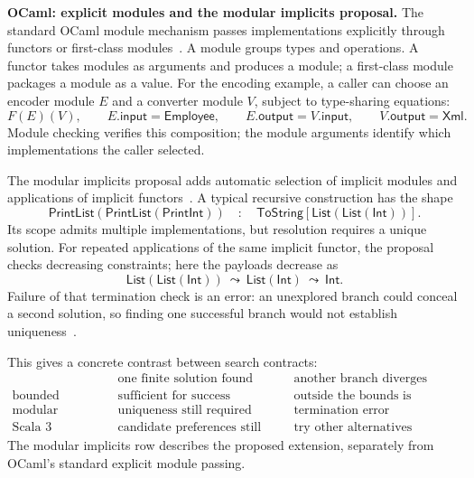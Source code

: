 \documentclass[10pt,a4paper]{article}
\newcommand{\Int}{\mathsf{Int}}
\newcommand{\TS}{\mathsf{ToString}}
\newcommand{\kw}[1]{\mathsf{#1}}
\begin{document}
\textbf{OCaml: explicit modules and the modular implicits proposal.}
The standard OCaml module mechanism passes implementations explicitly through
functors or first-class modules~\cite{ocaml-modules}.
A module groups types and operations. A functor takes modules as arguments and
produces a module; a first-class module packages a module as a value.
For the encoding example, a caller can choose an encoder module $E$ and a
converter module $V$, subject to type-sharing equations:
\[
 F(E)(V),\qquad E.\kw{input}=\kw{Employee},\qquad
 E.\kw{output}=V.\kw{input},\qquad V.\kw{output}=\kw{Xml}.
\]
Module checking verifies this composition; the module arguments identify which
implementations the caller selected.

The modular implicits proposal adds automatic selection of implicit modules and
applications of implicit functors~\cite{modular-implicits}. A typical recursive
construction has the shape
\[
 \kw{PrintList}(\kw{PrintList}(\kw{PrintInt}))
 \quad:\quad \TS[\kw{List}(\kw{List}(\Int))].
\]
Its scope admits multiple implementations, but resolution requires a unique solution.
For repeated applications of the same implicit functor, the proposal checks
decreasing constraints; here the payloads decrease as
\[
 \kw{List}(\kw{List}(\Int))
 \ \leadsto\ \kw{List}(\Int)
 \ \leadsto\ \Int.
\]
Failure of that termination check is an error: an unexplored branch could conceal
a second solution, so finding one successful branch would not establish
uniqueness~\cite{modular-implicits}.

This gives a concrete contrast between search contracts:
\[
\begin{array}{c|c|c}
 & \text{one finite solution found} & \text{another branch diverges}\\ \hline
 \text{bounded existence} & \text{sufficient for success} & \text{outside the bounds is irrelevant}\\
 \text{modular implicits} & \text{uniqueness still required} & \text{termination error}\\
 \text{Scala 3} & \text{candidate preferences still apply} & \text{try other alternatives}
\end{array}
\]
The modular implicits row describes the proposed extension, separately from
OCaml's standard explicit module passing.

\newpage
\end{document}
